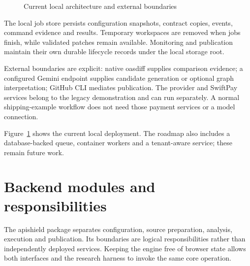 \documentclass[12pt,a4paper,oneside]{report}
\begin{document}
\begin{figure}[htbp]\centering
{}
\caption{Current local architecture and external boundaries}\label{fig:4.1}
\end{figure}

The local job store persists configuration snapshots, contract copies, events, command evidence and results. Temporary workspaces are removed when jobs finish, while validated patches remain available. Monitoring and publication maintain their own durable lifecycle records under the local storage root.

External boundaries are explicit: native oasdiff supplies comparison evidence; a configured Gemini endpoint supplies candidate generation or optional graph interpretation; GitHub CLI mediates publication. The provider and SwiftPay services belong to the legacy demonstration and can run separately. A normal shipping-example workflow does not need those payment services or a model connection.

Figure~\ref{fig:4.1} shows the current local deployment. The roadmap also includes a database-backed queue, container workers and a tenant-aware service; these remain future work.

\section{Backend modules and responsibilities}

The apishield package separates configuration, source preparation, analysis, execution and publication. Its boundaries are logical responsibilities rather than independently deployed services. Keeping the engine free of browser state allows both interfaces and the research harness to invoke the same core operation.
\end{document}
